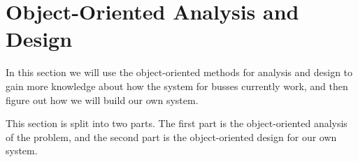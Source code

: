 \section{Object-Oriented Analysis and Design}
In this section we will use the object-oriented methods for analysis and design to gain more knowledge about how the system for busses currently work, and then figure out how we will build our own system.

This section is split into two parts. The first part is the object-oriented analysis of the problem, and the second part is the object-oriented design for our own system.
